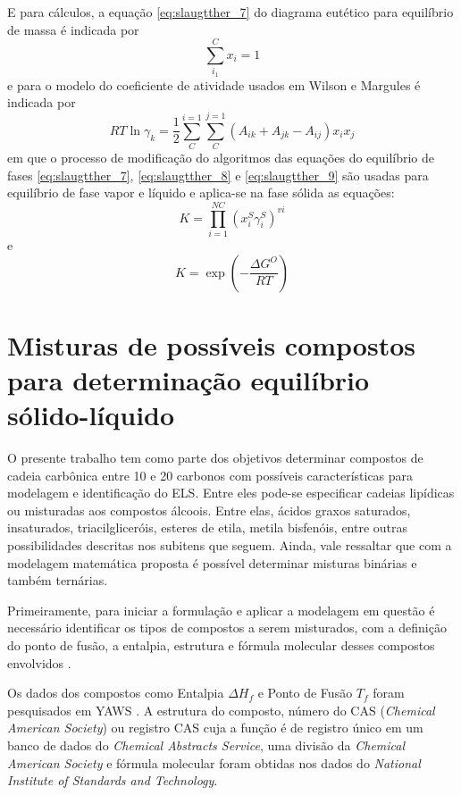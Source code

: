 	E para cálculos, a equação \ref{eq:slaugtther_7} do diagrama eutético para equilíbrio de massa é indicada por
	\begin{equation}\label{eq:slaugtther_8}
	\sum_{i_1}^{C}x_{i}=1
	\end{equation}
	e para o modelo do coeficiente de atividade usados em Wilson e Margules é indicada por
	\begin{equation}\label{eq:slaugtther_9}
	RT\ln\gamma_{k}=\dfrac{1}{2}\sum_{C}^{i=1}\sum_{C}^{j=1}(A_{ik}+A_{jk}-A_{ij})x_{i}x_{j}
	\end{equation}
	em que o processo de modificação do algoritmos das equações do equilíbrio de fases \ref{eq:slaugtther_7}, \ref{eq:slaugtther_8} e \ref{eq:slaugtther_9} são usadas para equilíbrio de fase vapor e líquido e aplica-se na fase sólida as equações:
	\begin{equation}\label{eq:slaugtther_10}
	K=\prod_{i=1}^{NC}(x_{i}^{S}\gamma_{i}^{S})^{vi}
	\end{equation}
	e
	\begin{equation}\label{eq:slaugtther_11}
	K=\exp\left(-\dfrac{\Delta G^O}{RT}\right)
	\end{equation}
	
	\section{Misturas de possíveis compostos para determinação equilíbrio sólido-líquido}
	
    O presente trabalho tem como parte dos objetivos determinar compostos de cadeia carbônica entre 10 e 20 carbonos com possíveis características para modelagem e identificação do ELS. Entre eles pode-se especificar cadeias lipídicas ou misturadas aos compostos álcoois. Entre elas, ácidos graxos saturados, insaturados, triacilgliceróis, esteres de etila, metila bisfenóis, entre outras possibilidades descritas nos subitens que seguem. Ainda, vale ressaltar que com a modelagem matemática proposta é possível determinar misturas binárias e também ternárias.
	
	Primeiramente, para iniciar a formulação e aplicar a modelagem em questão é necessário identificar os tipos de compostos a serem misturados, com a definição do ponto de fusão, a entalpia, estrutura e fórmula molecular desses compostos envolvidos \cite{Yaws2014a}.
	
	Os dados dos compostos como Entalpia $\Delta H_{f}$ e Ponto de Fusão $T_f$ foram pesquisados em YAWS \citeyear{Yaws2014}. A estrutura do composto, número do CAS (\textit{Chemical American Society}) ou registro CAS cuja a função é de registro único em um banco de dados do \textit{Chemical Abstracts Service}, uma divisão da \textit{Chemical American Society} e fórmula molecular foram obtidas nos dados do \textit{National Institute of Standards and Technology}. \citeyear{nist2020}
	
